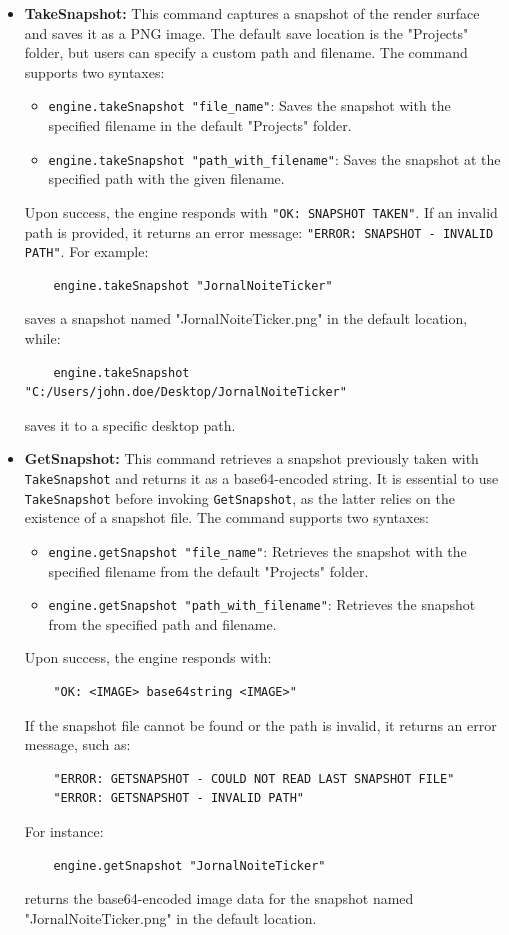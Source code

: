 \begin{itemize}
    \item \textbf{TakeSnapshot:} This command captures a snapshot of the render surface and saves it as a PNG image. The default save location is the "Projects" folder, but users can specify a custom path and filename. The command supports two syntaxes:
    \begin{itemize}
        \item \texttt{engine.takeSnapshot "file\_name"}: Saves the snapshot with the specified filename in the default "Projects" folder.
        \item \texttt{engine.takeSnapshot "path\_with\_filename"}: Saves the snapshot at the specified path with the given filename.
    \end{itemize}
    Upon success, the engine responds with \texttt{"OK: SNAPSHOT TAKEN"}. If an invalid path is provided, it returns an error message: \texttt{"ERROR: SNAPSHOT - INVALID PATH"}. For example:
    \begin{verbatim}
    engine.takeSnapshot "JornalNoiteTicker"
    \end{verbatim}
    saves a snapshot named "JornalNoiteTicker.png" in the default location, while:
    \begin{verbatim}
    engine.takeSnapshot "C:/Users/john.doe/Desktop/JornalNoiteTicker"
    \end{verbatim}
    saves it to a specific desktop path.

    \item \textbf{GetSnapshot:} This command retrieves a snapshot previously taken with \texttt{TakeSnapshot} and returns it as a base64-encoded string. It is essential to use \texttt{TakeSnapshot} before invoking \texttt{GetSnapshot}, as the latter relies on the existence of a snapshot file. The command supports two syntaxes:
    \begin{itemize}
        \item \texttt{engine.getSnapshot "file\_name"}: Retrieves the snapshot with the specified filename from the default "Projects" folder.
        \item \texttt{engine.getSnapshot "path\_with\_filename"}: Retrieves the snapshot from the specified path and filename.
    \end{itemize}
    Upon success, the engine responds with:
    \begin{verbatim}
    "OK: <IMAGE> base64string <IMAGE>"
    \end{verbatim}
    If the snapshot file cannot be found or the path is invalid, it returns an error message, such as:
    \begin{verbatim}
    "ERROR: GETSNAPSHOT - COULD NOT READ LAST SNAPSHOT FILE"
    "ERROR: GETSNAPSHOT - INVALID PATH"
    \end{verbatim}
    For instance:
    \begin{verbatim}
    engine.getSnapshot "JornalNoiteTicker"
    \end{verbatim}
    returns the base64-encoded image data for the snapshot named "JornalNoiteTicker.png" in the default location.


\end{itemize}

